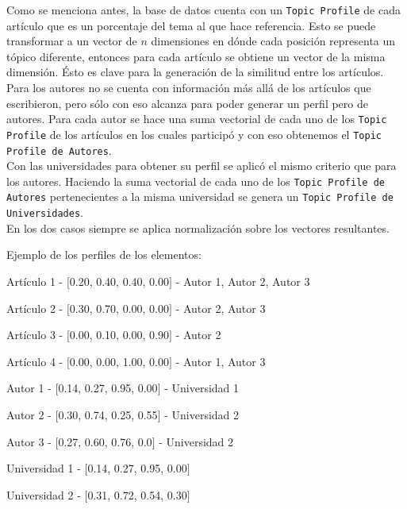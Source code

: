 Como se menciona antes, la base de datos cuenta con un \texttt{Topic Profile} de cada artículo que es un porcentaje del tema al que hace referencia. Esto se puede transformar a un vector de $n$ dimensiones en dónde cada posición representa un tópico diferente, entonces para cada artículo se obtiene un vector de la misma dimensión. Ésto es clave para la generación de la similitud entre los artículos.\\
Para los autores no se cuenta con información más allá de los artículos que escribieron, pero sólo con eso alcanza para poder generar un perfil pero de autores. Para cada autor se hace una suma vectorial de cada uno de los \texttt{Topic Profile} de los artículos en los cuales participó y con eso obtenemos el \texttt{Topic Profile de Autores}.\\
Con las universidades para obtener su perfil se aplicó el mismo criterio que para los autores. Haciendo la suma vectorial de cada uno de los \texttt{Topic Profile de Autores} pertenecientes a la misma universidad se genera un \texttt{Topic Profile de Universidades}.\\
En los dos casos siempre se aplica normalización sobre los vectores resultantes.

Ejemplo de los perfiles de los elementos:

\begin{description}
 \item[Artículo - Topic Profile - Autores]
 \item Artículo 1 - $[$0.20, 0.40, 0.40, 0.00$]$ - Autor 1, Autor 2, Autor 3
 \item Artículo 2 - $[$0.30, 0.70, 0.00, 0.00$]$ - Autor 2, Autor 3
 \item Artículo 3 - $[$0.00, 0.10, 0.00, 0.90$]$ - Autor 2
 \item Artículo 4 - $[$0.00, 0.00, 1.00, 0.00$]$ - Autor 1, Autor 3
\end{description}

\begin{description}
 \item[Autor - Topic Profile - Universidad]
 \item Autor 1 - $[$0.14, 0.27, 0.95, 0.00$]$ - Universidad 1
 \item Autor 2 - $[$0.30, 0.74, 0.25, 0.55$]$ - Universidad 2
 \item Autor 3 - $[$0.27, 0.60, 0.76, 0.0$]$ - Universidad 2
\end{description}

\begin{description}
 \item[Universidad - Topic Profile]
 \item Universidad 1 - $[$0.14, 0.27, 0.95, 0.00$]$
 \item Universidad 2 - $[$0.31, 0.72, 0.54, 0.30$]$
\end{description}

